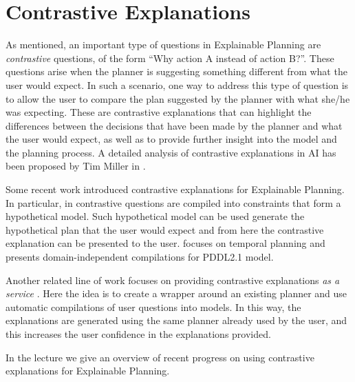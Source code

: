 \section{Contrastive Explanations}
\label{contrastive}




As mentioned, an important type of questions in Explainable Planning are \textit{contrastive} questions, of the form “Why action A
instead of action B?”.  These questions arise when the planner is suggesting something different from what the user would expect. In such a scenario, one way to address this type of question is to allow the user to compare the plan suggested by the planner with what she/he was expecting.  These are contrastive explanations that can highlight the differences between the decisions that have been made by the planner and what the user would expect, as well as to provide further insight into the model and the planning process. A detailed analysis of contrastive explanations in AI has been proposed by Tim Miller in \cite{miller:corr-18}.

Some recent work introduced contrastive explanations for Explainable Planning. In particular, in \cite{ben} contrastive questions are compiled into constraints that form a hypothetical model. Such hypothetical model can be used generate the hypothetical plan that the user would expect and from here the contrastive explanation can be presented to the user. \cite{ben} focuses on temporal planning and presents domain-independent compilations for PDDL2.1 model. 

Another related line of work focuses on providing contrastive explanations \textit{as a service} \cite{xaipservice}. Here the idea is to create a wrapper around an existing planner and use automatic compilations of user questions into models. In this way, the explanations are generated using the same planner already used by the user, and this increases the user confidence  in the explanations provided.

In the lecture we give an overview of recent progress on using contrastive explanations for Explainable Planning. 